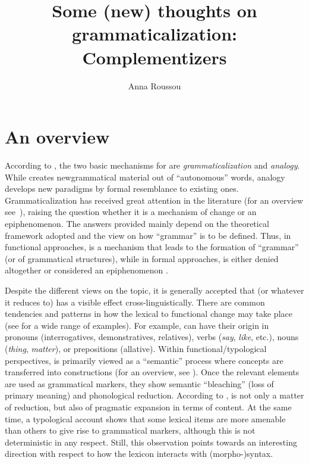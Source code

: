 \documentclass[output=paper]{langsci/langscibook}
\author{Anna Roussou\affiliation{University of Patras}}
\title{Some (new) thoughts on grammaticalization: Complementizers}
\begin{document}
\glsresetall


\section{An overview}

According to \citet{Meillet:1912}, the two basic mechanisms for  are \emph{grammaticalization} and \emph{analogy}. While
 creates new\linebreak grammatical material out of
\enquote{autonomous} words, analogy develops new para\-digms by formal
resemblance to existing ones. Grammaticalization has
received great attention in the literature (for an overview
see~\citealt{NarHei2011}), raising the question whether it is a mechanism of
change or an epiphenomenon. The answers provided mainly depend on the
theoretical framework adopted and the view on how \enquote{grammar} is to be
defined.  Thus, in functional approaches,  is a
mechanism that leads to the formation of \enquote{grammar} (or of grammatical
structures), while in formal approaches,  is either
denied altogether
\parencite{Newmeyer1998,Lightfoot1998,Lightfoot2006,Janda2001,Joseph2011} or
considered an epiphenomenon \parencite{RobRou2003,vanGelderen2004}.

Despite the different views on the topic, it is generally accepted that
 (or whatever it reduces to) has a visible effect
cross-lin\-gu\-is\-ti\-cal\-ly. There are common tendencies and patterns in how the
lexical to functional change may take place (see \citealt{HeiKut2002} for a
wide range of examples). For example,  can have their
origin in pronouns (in\-ter\-rog\-a\-tives, demon\-stra\-tives, relatives),
verbs (\emph{say}, \emph{like}, etc.), nouns (\emph{thing}, \emph{matter}), or
prepositions (allative). Within functional/typological perspectives,
 is pri\-mar\-i\-ly viewed as a \enquote{semantic}
process where concepts are transferred into constructions (for an overview, see
\citealt{HoppTrau2003}). Once the relevant elements are used as grammatical
markers, they show semantic \enquote{bleaching} (loss of primary meaning) and
phonological reduction. According to \citet{Traugott2010},
 is not only a matter of reduction, but also of
pragmatic expansion in terms of content. At the same time, a typological
account shows that some lexical items are more amenable than others to give
rise to grammatical markers, although this is not deterministic in any respect.
Still, this observation points towards an interesting direction with respect to
how the lexicon interacts with (morpho-)syntax.
\end{document}
